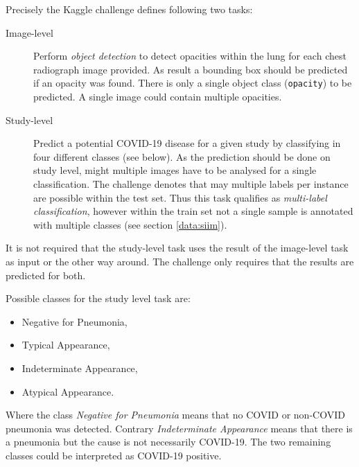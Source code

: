 Precisely the Kaggle challenge defines following two tasks:

\begin{description}
    \item[Image-level] Perform \textit{object detection} to detect opacities within the lung for each chest radiograph image provided. As result a bounding box should be predicted if an opacity was found. There is only a single object class (\texttt{opacity}) to be predicted. A single image could contain multiple opacities.
    \item[Study-level] Predict a potential COVID-19 disease for a given study by classifying in four different classes (see below). As the prediction should be done on study level, might multiple images have to be analysed for a single classification. The challenge denotes that may multiple labels per instance are possible within the test set. Thus this task qualifies as \textit{multi-label classification}, however within the train set not a single sample is annotated with multiple classes (see section \ref{data:siim}).
\end{description}

It is not required that the study-level task uses the result of the image-level task as input or the other way around. The challenge only requires that the results are predicted for both.

Possible classes for the study level task are:

\begin{itemize}
    \item Negative for Pneumonia,
    \item Typical Appearance,
    \item Indeterminate Appearance,
    \item Atypical Appearance.
\end{itemize}

Where the class \textit{Negative for Pneumonia} means that no COVID or non-COVID pneumonia was detected. Contrary \textit{Indeterminate Appearance} means that there is a pneumonia but the cause is not necessarily COVID-19. The two remaining classes could be interpreted as COVID-19 positive.

